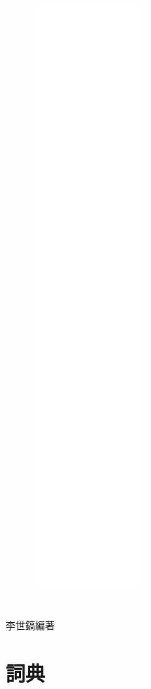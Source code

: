 \documentclass[a5paper,12pt]{memoir}
\begin{document}
\frontmatter
\linespread{1.25}
\begin{figure}
\includegraphics[height=220mm]{cover.png}
\end{figure}
\hfill
\vfill
{}\\
{李世鎬\hspace{14pt}編著}
\vspace{64pt}
\addtolength{\topmargin}{15mm}
\newpage
\linespread{1.25}

\mainmatter
\section{詞典}
\linespread{1.25}
\begin{multicols}{3}

\end{multicols}
\appendix
\newpage

\end{document}
